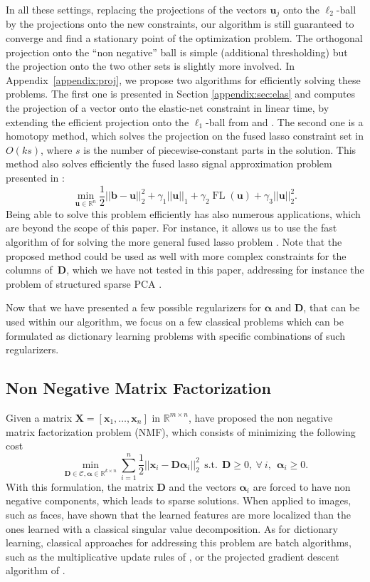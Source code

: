 \documentclass[twoside,11pt]{article}
\def\x{{\mathbf x}}
\def\X{{\mathbf X}}
\def\alphab{{\boldsymbol\alpha}}
\def\D{{\mathbf D}}
\def\C{{\mathcal C}}
\def\b{{\mathbf b}}
\def\u{{\mathbf u}}
\def\Real{{\mathbb R}}
\def\u{{\mathbf u}}
\def\FL{\operatorname{FL}}
\def\st{~~\text{s.t.}~~}
\begin{document}
In all these settings, replacing the projections of the vectors $\u_j$ onto the $\ell_2$-ball by
the projections onto the new constraints, our algorithm is still guaranteed to converge and find a
stationary point of the optimization problem.  The orthogonal projection onto the
``non negative'' ball is simple (additional thresholding) but the projection onto the two
other sets is slightly more involved. In
Appendix~\ref{appendix:proj}, we propose two algorithms for efficiently solving these
problems. The first one is presented in Section \ref{appendix:sec:elas} and computes the 
projection of a vector onto the elastic-net constraint in linear time, by
extending the efficient projection onto the $\ell_1$-ball from \citet{maculan} and \citet{duchi}.
The second one is a homotopy method, which solves the projection on the fused
lasso constraint set in $O(ks)$, where $s$ is the number of
piecewise-constant parts in the solution.  This method also solves
efficiently the fused lasso signal approximation problem
presented in \citet{friedman}:
\begin{displaymath}
   \min_{\u \in \Real^n} \frac{1}{2}||\b-\u||_2^2 + \gamma_1||\u||_1 +
   \gamma_2 \FL(\u) + \gamma_3||\u||_2^2.
\end{displaymath}
Being able to solve this problem efficiently has also numerous applications,
which are beyond the scope of this paper. For instance, it allows us to use
the fast algorithm of \citet{nesterov} for solving the more general fused
lasso problem \citep{tibshirani2}.
Note that the proposed method could be used as well with more complex constraints
for the columns of~$\D$, which we have not tested in this paper, 
addressing for instance the problem of structured sparse PCA \citep{jenatton2}.

Now that we have presented a few possible regularizers for $\alphab$ and $\D$,
that can be used within our algorithm, we focus on a few classical problems
which can be formulated as dictionary learning problems with 
specific combinations of such regularizers.
\subsection{Non Negative Matrix Factorization}
Given a matrix $\X = [\x_1,\ldots,\x_n]$ in $\Real^{m \times n}$, 
\citet{lee2} have proposed the non 
negative matrix factorization problem (NMF), which consists of minimizing 
the following cost
\begin{displaymath}
 \min_{\D \in \C, \alphab \in \Real^{k \times n}}
   \sum_{i=1}^n \frac{1}{2}||\x_i-\D\alphab_i||_2^2 \st \D \geq 0,~\forall~i,~~ \alphab_i \geq 0. 
\end{displaymath}
With this formulation, the matrix $\D$ and the vectors $\alphab_i$ are forced
to have non negative components, which leads to sparse solutions.
When applied to images, such as faces,
\citet{lee2} have shown that the learned features are more localized than the
ones learned with a classical singular value decomposition. 
As for dictionary learning, classical approaches for addressing this problem
are batch algorithms, such as the multiplicative update rules of
\citet{lee2}, or the projected gradient descent algorithm of \citet{lin}.
\end{document}
